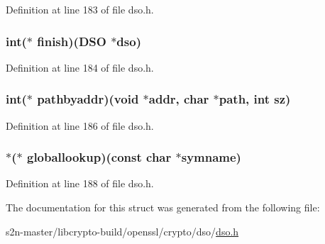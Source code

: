 Definition at line 183 of file dso.\+h.

\subsubsection[{\texorpdfstring{finish}{finish}}]{\setlength{\rightskip}{0pt plus 5cm}int($\ast$ finish)({\bf D\+SO} $\ast$dso)}\hypertarget{structdso__meth__st_a2b439f5784dbc30da93d2b34c6dfe9bf}{}\label{structdso__meth__st_a2b439f5784dbc30da93d2b34c6dfe9bf}


Definition at line 184 of file dso.\+h.

\subsubsection[{\texorpdfstring{pathbyaddr}{pathbyaddr}}]{\setlength{\rightskip}{0pt plus 5cm}int($\ast$ pathbyaddr)({\bf void} $\ast$addr, char $\ast$path, int sz)}\hypertarget{structdso__meth__st_a5fd57212f9b2d00350a73c945c57f132}{}\label{structdso__meth__st_a5fd57212f9b2d00350a73c945c57f132}


Definition at line 186 of file dso.\+h.

\subsubsection[{\texorpdfstring{globallookup}{globallookup}}]{ $\ast$($\ast$ globallookup)(const char $\ast$symname)}\hypertarget{structdso__meth__st_ad68d27a8fce53b86d9f6161e47b7370c}{}\label{structdso__meth__st_ad68d27a8fce53b86d9f6161e47b7370c}


Definition at line 188 of file dso.\+h.



The documentation for this struct was generated from the following file\+:\begin{DoxyCompactItemize}
\item 
s2n-\/master/libcrypto-\/build/openssl/crypto/dso/\hyperlink{crypto_2dso_2dso_8h}{dso.\+h}\end{DoxyCompactItemize}
